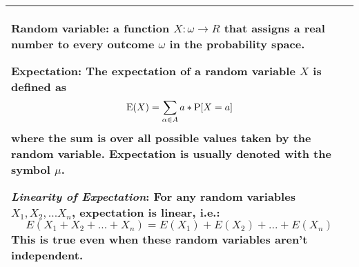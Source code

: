 {\tabulinesep=1mm
\begin{tabu}{|p{16cm} |}

\hline

\textbf{Random variable}: a function $X : \omega \rightarrow R$ 
that assigns a real number to every outcome $\omega$ in the probability space.

\vspace{6mm}


\textbf{Expectation}: The expectation of a random variable $X$ is defined as
$$\text{E}(X) = \sum_{\alpha \in A}a * \text{P}[X = a]$$ where the sum is over all possible values taken by the random variable. Expectation is usually denoted with the symbol $\mu$.

\vspace{2mm}

\textit{Linearity of Expectation}: For any random variables $X_1, X_2, ... X_n$, expectation is linear, i.e.:
$$E(X_1 + X_2 + ... + X_n) = E(X_1) + E(X_2) + ... + E(X_n)$$
This is true even when these random variables aren't independent.

\\
\hline
\end{tabu}

}
